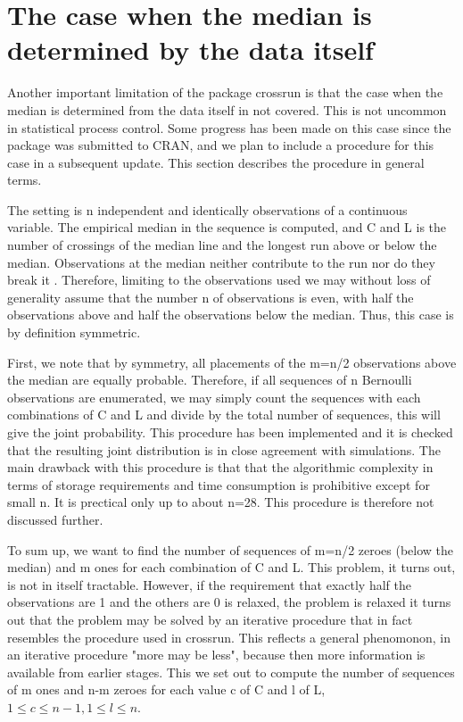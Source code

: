 \section{The case when the median is determined by the data itself}

Another important limitation of the package crossrun is that the case when the median is determined from the data itself in not covered. This is not uncommon in statistical process control. Some progress has been made on this case since the package was submitted to CRAN, and we plan to include a procedure for this case in a subsequent update. This section describes the procedure in general terms. 

The setting is n independent and identically observations of a continuous variable. The empirical median in the sequence is computed, and C and L is the number of crossings of the median line and the longest run above or below the median. Observations at the median neither contribute to the run nor do they break it \citep{Anhoej:2015}. Therefore, limiting to the observations used we may without loss of generality assume that the number n of observations is even, with half the observations above and half the observations below the median. Thus, this case is by definition symmetric.

First, we note that by symmetry, all placements of the m=n/2 observations above the median are equally probable. Therefore, if all sequences of n Bernoulli observations are enumerated, we may simply count the sequences with each combinations of C and L and divide by the total number of sequences, this will give the joint probability. This procedure has been implemented and it is checked that the resulting joint distribution is in close agreement with simulations. The main drawback with this procedure is that that the algorithmic complexity in terms of storage requirements and time consumption is prohibitive except for small n. It is prectical only up to about n=28. This procedure is therefore not discussed further.

To sum up, we want to find the number of sequences of m=n/2 zeroes (below the median) and m ones for each combination of C and L. This problem, it turns out, is not in itself tractable. However, if the requirement that exactly half the observations are 1 and the others are 0 is relaxed, the problem is relaxed it turns out that the problem may be solved by an iterative procedure that in fact resembles the procedure used in crossrun. This reflects a general phenomonon, in an iterative procedure "more may be less", because then more information is available from earlier stages. This we set out to compute the number of sequences of m ones and n-m zeroes for each value c of C and l of L, $1 \leq c \leq n-1, 1 \leq l \leq n$. 

